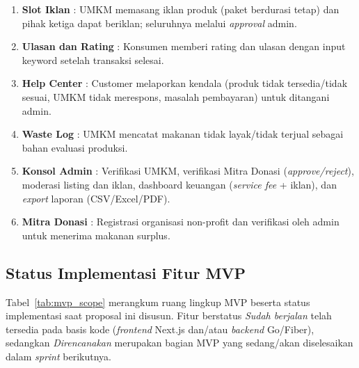 \begin{enumerate}[leftmargin=*]
    \item \textbf{Slot Iklan} : UMKM memasang iklan produk (paket berdurasi tetap) dan pihak ketiga
    dapat beriklan; seluruhnya melalui \textit{approval} admin.

    \item \textbf{Ulasan dan Rating} : Konsumen memberi rating dan ulasan dengan input keyword
    setelah transaksi selesai.

    \item \textbf{Help Center} : Customer melaporkan kendala (produk tidak tersedia/tidak sesuai,
    UMKM tidak merespons, masalah pembayaran) untuk ditangani admin.

    \item \textbf{Waste Log} : UMKM mencatat makanan tidak layak/tidak terjual sebagai bahan
    evaluasi produksi.

    \item \textbf{Konsol Admin} : Verifikasi UMKM, verifikasi Mitra Donasi (\textit{approve/reject}),
    moderasi listing dan iklan, dashboard keuangan (\textit{service fee} + iklan), dan \textit{export}
    laporan (CSV/Excel/PDF).

    \item \textbf{Mitra Donasi} : Registrasi organisasi non-profit dan verifikasi oleh admin untuk
    menerima makanan surplus.
\end{enumerate}

\subsection{Status Implementasi Fitur MVP}

Tabel~\ref{tab:mvp_scope} merangkum ruang lingkup MVP beserta status implementasi saat proposal ini
disusun. Fitur berstatus \emph{Sudah berjalan} telah tersedia pada basis kode (\textit{frontend}
Next.js dan/atau \textit{backend} Go/Fiber), sedangkan \emph{Direncanakan} merupakan bagian MVP yang
sedang/akan diselesaikan dalam \textit{sprint} berikutnya.

